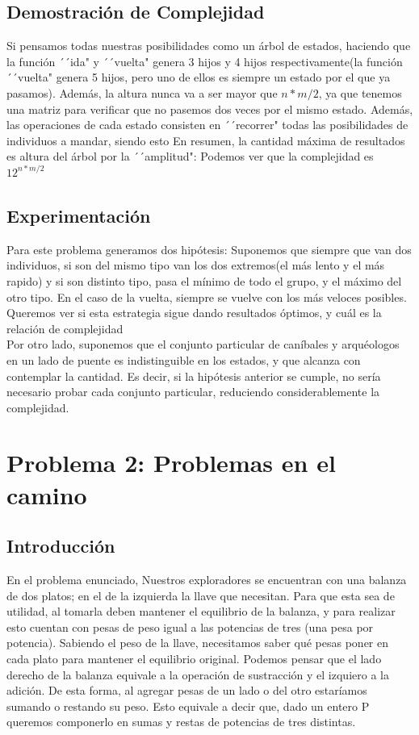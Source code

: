 \documentclass[spanish,12pt]{article}
\begin{document}
\subsection{Demostración de Complejidad}
	Si pensamos todas nuestras posibilidades como un árbol de estados, haciendo que la función ´´ida" y ´´vuelta" genera 3 hijos y 4 hijos respectivamente(la función ´´vuelta" genera 5 hijos, pero uno de ellos es siempre un estado por el que ya pasamos).
	 Además, la altura nunca va a ser mayor que $n*m/2$, ya que tenemos una matriz para verificar que no pasemos dos veces por el mismo estado. Además, las operaciones de cada estado consisten en ´´recorrer" todas las posibilidades de individuos a mandar, siendo esto %
	 En resumen, la cantidad máxima de resultados es altura del árbol por la ´´amplitud": Podemos ver que la complejidad es $12^{n*m/2}$
\subsection{Experimentación}
Para este problema generamos dos hipótesis:
Suponemos que siempre que van dos individuos, si son del mismo tipo van los dos extremos(el más lento y el más rapido) y si son distinto tipo, pasa el mínimo de todo el grupo, y el máximo del otro tipo.
En el caso de la vuelta, siempre se vuelve con los más veloces posibles.
Queremos ver si esta estrategia sigue dando resultados óptimos, y cuál es la relación de complejidad
\\
Por otro lado, suponemos que el conjunto particular de caníbales y arquéologos en un lado de puente es indistinguible en los estados, y que alcanza con contemplar la cantidad. Es decir, si la hipótesis anterior se cumple, no sería necesario probar cada conjunto particular, reduciendo considerablemente la complejidad.



\section{Problema 2: Problemas en el camino}

\subsection{Introducción}

En el problema enunciado, Nuestros exploradores se encuentran con una balanza de dos platos; en el de la izquierda la llave que necesitan. Para que esta sea de utilidad, al tomarla deben mantener el equilibrio de la balanza, y para realizar esto cuentan con pesas de peso igual a las potencias de tres (una pesa por potencia).
Sabiendo el peso de la llave, necesitamos saber qué pesas poner en cada plato para mantener el equilibrio original.
Podemos pensar que el lado derecho de la balanza equivale a la operación de sustracción y el izquiero a la adición. De esta forma, al agregar pesas de un lado o del otro estaríamos sumando o restando su peso.
Esto equivale a decir que, dado un entero P queremos componerlo en sumas y restas de potencias de tres distintas.
\end{document}
